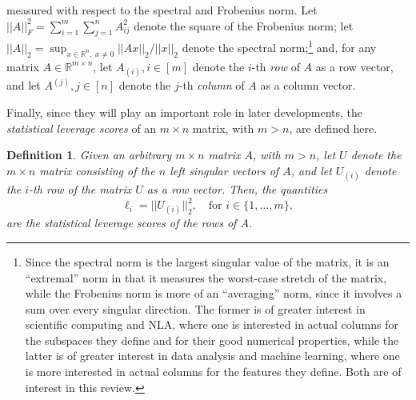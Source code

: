 \documentclass[twoside]{article}
\newtheorem{definition}{Definition}
\begin{document}
measured with respect to the spectral and Frobenius norm.
Let
$ ||A||_F^2 = \sum_{i=1}^m \sum_{j=1}^n A_{ij}^2 $ denote the square of 
the
Frobenius norm; let $||A||_2 = \sup_{x\in \mathbb{R}^n,\ x\neq 0} ||Ax||_2/||x||_2$
denote 
the
spectral norm;\footnote{Since the spectral norm is the largest singular value of the 
matrix, it is an ``extremal'' norm in that it measures the 
worst-case stretch of the matrix, while the Frobenius norm is more of an 
``averaging'' norm, since it involves a sum over every singular direction.
The former is of greater interest in scientific computing and NLA, where one 
is interested in actual columns for the subspaces they define and for their 
good numerical properties, while the latter is of greater interest in data 
analysis and machine learning, where one is more interested in actual 
columns for the features they define.  Both are of interest in this review.}
and,
for any matrix $A \in \mathbb{R}^{m \times n}$, let $A_{(i)}, i \in [m]$ 
denote the $i$-th \emph{row} of $A$ as a row vector, and let $A^{(j)}, j \in [n]$
denote the $j$-th \emph{column} of $A$ as a column vector.

Finally, since they will play an important role in later developments, the 
\emph{statistical leverage scores} of an $m \times n$ matrix, with $m > n$, 
are defined here.
\begin{definition}
\label{def:lev-scores}
Given an arbitrary $m \times n$ matrix $A$, with $m > n$, let $U$ denote
the $m \times n$ matrix consisting of the $n$ left singular vectors of $A$,
and let $U_{(i)}$ denote the $i$-th row of the matrix $U$ as a row vector.
Then, the quantities 
$$
\ell_i = ||U_{(i)}||_2^2  ,
\quad
\mbox{for }
i\in\{1,\ldots,m\}  ,
$$
are the \emph{statistical leverage scores} of the rows of $A$.
\end{definition}
\end{document}
